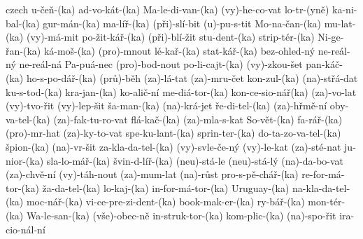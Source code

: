 \begin{hyphenrules}{czech}
{ u-čeň-(ka)
 ad-vo-kát-(ka)
 Ma-le-di-van-(ka)
 (vy)-he-co-vat
 lo-tr-(yně)
 ka-ni-bal-(ka)
 gur-mán-(ka)
 ma-líř-(ka)
 (při)-slí-bit
 (u)-pu-s-tit
 Mo-na-čan-(ka)
 mu-lat-(ka)
 (vy)-má-mit
 po-žit-kář-(ka)
(při)-blí-žit
stu-dent-(ka)
strip-tér-(ka)
Ni-ge-řan-(ka)
ká-moš-(ka)
(pro)-mnout
lé-kař-(ka)
stat-kář-(ka)
bez-ohled-ný
ne-reál-ný
ne-reál-ná
Pa-puá-nec
(pro)-bod-nout
po-li-cajt-(ka)
(vy)-zkou-šet
pan-káč-(ka)
ho-s-po-dář-(ka)
(prů)-běh
(za)-lá-tat
(za)-mru-čet
kon-zul-(ka)
(na)-střá-dat
ku-s-tod-(ka)
kra-jan-(ka)
ko-alič-ní
me-diá-tor-(ka)
kon-ce-sio-nář(ka)
(za)-vo-lat
(vy)-tvo-řit
(vy)-lep-šit
ša-man-(ka)
(na)-krá-jet
ře-di-tel-(ka)
(za)-hřmě-ní
oby-va-tel-(ka)
(za)-fak-tu-ro-vat
flá-kač-(ka)
(za)-mla-s-kat
So-vět-(ka)
fa-rář-(ka)
(pro)-mr-hat
(za)-ky-to-vat
spe-ku-lant-(ka)
sprin-ter-(ka)
do-ta-zo-va-tel-(ka)
špion-(ka)
(na)-vr-šit
za-kla-da-tel-(ka)
(vy)-svle-če-ný
(vy)-le-kat
(za)-sté-nat
ju-nior-(ka)
sla-lo-mář-(ka)
švin-d-líř-(ka)
(neu)-stá-le
(neu)-stá-lý
(na)-da-bo-vat
(za)-chvě-ní
(vy)-táh-nout
(za)-mum-lat
(na)-růst
pro-s-pě-chář-(ka)
re-for-má-tor-(ka)
ža-da-tel-(ka)
lo-kaj-(ka)
in-for-má-tor-(ka)
Uruguay-(ka)
na-kla-da-tel-(ka)
moc-nář-(ka)
vi-ce-pre-zi-dent-(ka)
book-mak-er-(ka)
ry-bář-(ka)
mon-tér-(ka)
Wa-le-san-(ka)
(vše)-obec-ně
in-struk-tor-(ka)
kom-plic-(ka)
(na)-spo-řit
ira-cio-nál-ní
}
\end{hyphenrules}
